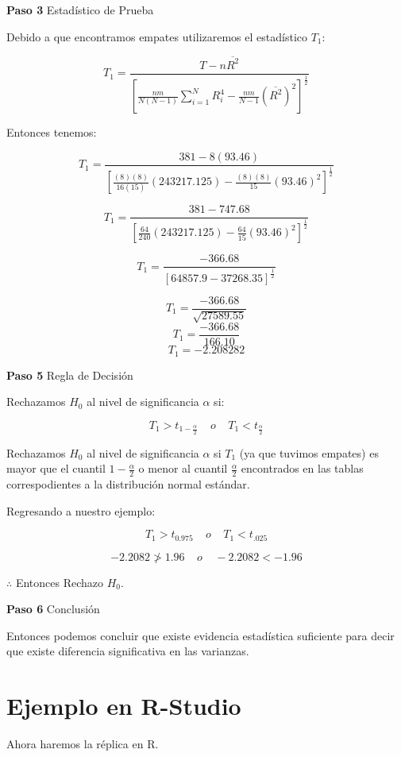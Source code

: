 \documentclass[
  a4paper,
  oneside,
  openany]{book}
\begin{document}
\textbf{Paso 3} Estadístico de Prueba

Debido a que encontramos empates utilizaremos el estadístico \(T_{1}\):

\[T_{1} = \frac{T-n\overline{R^2}}{\left[\frac{nm}{N(N-1)}\sum_{i=1}^{N}R_{i}^4-\frac{nm}{N-1}(\overline{R^2})^2\right]^\frac{1}{2}}\]

Entonces tenemos:

\[T_{1} = \frac{381-8(93.46)}{\left[\frac{(8)(8)}{16(15)}(243217.125)-\frac{(8)(8)}{15}(93.46)^2\right]^\frac{1}{2}}\]

\[T_{1} = \frac{381-747.68}{\left[\frac{64}{240}(243217.125)-\frac{64}{15}(93.46)^2\right]^\frac{1}{2}}\]

\[T_{1} = \frac{-366.68}{[64857.9-37268.35]^\frac{1}{2}}\]

\[T_{1} = \frac{-366.68}{\sqrt{27589.55}}\]
\[T_{1} = \frac{-366.68}{166.10}\]
\[T_{1}= -2.208282\]

\textbf{Paso 5} Regla de Decisión

Rechazamos \(H_0\) al nivel de significancia \(\alpha\) si:

\[T_{1}>t_{1-\frac{\alpha}{2}} \ \ \ \ \  o  \ \ \ \ \ T_{1}<t_{\frac{\alpha}{2}}\]

Rechazamos \(H_0\) al nivel de significancia \(\alpha\) si \(T_{1}\) (ya que tuvimos empates) es mayor que el cuantil \(1-\frac{\alpha}{2}\) o menor al cuantil \(\frac{\alpha}{2}\) encontrados en las tablas correspodientes a la distribución normal estándar.

Regresando a nuestro ejemplo:

\[T_{1}>t_{0.975} \ \ \ \ \  o \ \ \ \ \ T_{1}<t_{.025}\]

\[-2.2082 \ngtr 1.96  \ \ \ \ \   o  \ \ \ \ \  -2.2082 < -1.96\]

\(\therefore\) Entonces Rechazo \(H_0\).

\textbf{Paso 6} Conclusión

Entonces podemos concluir que existe evidencia estadística suficiente para decir que existe diferencia significativa en las varianzas.

\hypertarget{ejemplo-en-r-studio-7}{%
\section{Ejemplo en R-Studio}\label{ejemplo-en-r-studio-7}}

Ahora haremos la réplica en R.
\end{document}

